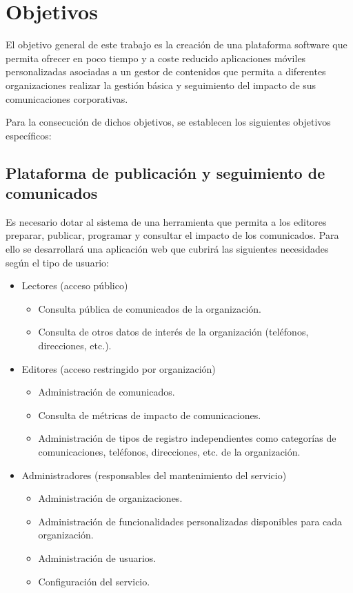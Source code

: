 \chapter{Objetivos}

El objetivo general de este trabajo es la creación de una plataforma software que permita ofrecer en poco tiempo y a coste reducido aplicaciones móviles personalizadas asociadas a un gestor de contenidos que permita a diferentes organizaciones realizar la gestión básica y seguimiento del impacto de sus comunicaciones corporativas.

Para la consecución de dichos objetivos, se establecen los siguientes objetivos específicos:

\section{Plataforma de publicación y seguimiento de comunicados}
Es necesario dotar al sistema de una herramienta que permita a los editores preparar, publicar, programar y  consultar el impacto de los comunicados. Para ello se desarrollará una aplicación web que cubrirá las siguientes necesidades según el tipo de usuario:
\begin{itemize}
    \item Lectores (acceso público)
    \begin{itemize}
        \item Consulta pública de comunicados de la organización.
        \item Consulta de otros datos de interés de la organización (teléfonos, direcciones, etc.).
    \end{itemize}
    \item Editores (acceso restringido por organización)
    \begin{itemize}
        \item Administración de comunicados.
        \item Consulta de métricas de impacto de comunicaciones.
        \item Administración de tipos de registro independientes como categorías de comunicaciones, teléfonos, direcciones, etc. de la organización.
    \end{itemize}
    \item Administradores (responsables del mantenimiento del servicio)
    \begin{itemize}
        \item Administración de organizaciones.
        \item Administración de funcionalidades personalizadas disponibles para cada organización.
        \item Administración de usuarios.
        \item Configuración del servicio.
    \end{itemize}
\end{itemize}

